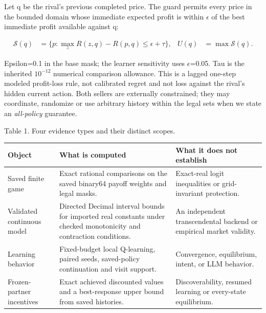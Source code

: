 \documentclass[a4paper,10pt]{article}
\newcommand{\reportcaption}[1]{{\fontsize{8.4}{10.2}\selectfont #1\par}\vspace{3pt}}
\begin{document}
Let q be the rival's previous completed price. The guard permits every price in the bounded domain whose immediate expected profit is within $\epsilon$ of the best immediate profit available against q:
\par

\begin{align*}
\mathcal S(q)&=\{p:\max_z R(z,q)-R(p,q)\leq\epsilon+\tau\}, & U(q)&=\max\mathcal S(q).
\end{align*}

Epsilon=0.1 in the base mask; the learner sensitivity uses $\epsilon$=0.05. Tau is the inherited $10^{-12}$ numerical comparison allowance. This is a lagged one-step modeled profit-loss rule, not calibrated regret and not loss against the rival's hidden current action. Both sellers are externally constrained; they may coordinate, randomize or use arbitrary history within the legal sets when we state an \emph{all-policy} guarantee.
\par

\reportcaption{Table 1. Four evidence types and their distinct scopes.}

{\fontsize{9}{10.8}\selectfont\noindent\begin{tabular}{@{}>{\raggedright\arraybackslash}p{0.2036660\dimexpr\linewidth-24pt\relax}>{\raggedright\arraybackslash}p{0.3951120\dimexpr\linewidth-24pt\relax}>{\raggedright\arraybackslash}p{0.4012220\dimexpr\linewidth-24pt\relax}@{}}\toprule
\textbf{Object} & \textbf{What is computed} & \textbf{What it does not establish}\\\midrule
Saved finite game & Exact rational comparisons on the saved binary64 payoff weights and legal masks. & Exact-real logit inequalities or grid-invariant protection.\\
Validated continuous model & Directed Decimal interval bounds for imported real constants under checked monotonicity and contraction conditions. & An independent transcendental backend or empirical market validity.\\
Learning behavior & Fixed-budget local Q-learning, paired seeds, saved-policy continuation and visit support. & Convergence, equilibrium, intent, or LLM behavior.\\
Frozen-partner incentives & Exact achieved discounted values and a best-response upper bound from saved histories. & Discoverability, resumed learning or every-state equilibrium.\\
\bottomrule\end{tabular}\par}\vspace{3pt}
\end{document}
